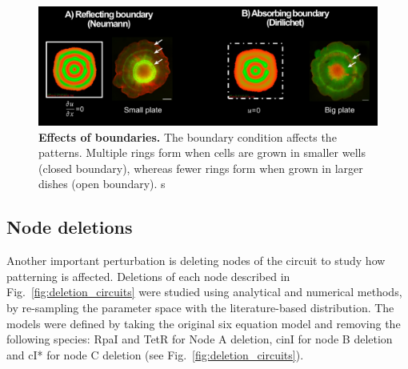 \begin{figure}[H] %
    \centering
    \begin{adjustbox}{center}
        \includegraphics[width=1\textwidth]{chapters/Chapter 3/boundary_conditions_colony} %
    \end{adjustbox}
    \caption{\textbf{Effects of boundaries.} The boundary condition affects the patterns. Multiple rings form when cells are grown in smaller wells (closed boundary), whereas fewer rings form when grown in larger dishes (open boundary). s}
    \label{fig:boundary_conditions_colony}
\end{figure}

\subsection{Node deletions}
Another important perturbation is deleting nodes of the circuit to study how patterning is affected.
Deletions of each node described in Fig.~\ref{fig:deletion_circuits} were studied using analytical and numerical methods, by re-sampling the parameter space with the literature-based distribution.
The models were defined by taking the original six equation model and removing the following species: RpaI and TetR for Node A deletion, cinI for node B deletion and cI* for node C deletion (see Fig.~\ref{fig:deletion_circuits}).

